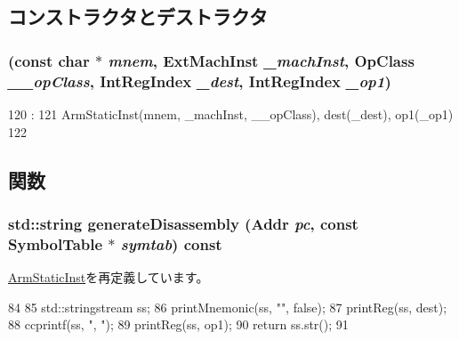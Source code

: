 \subsection{コンストラクタとデストラクタ}
\hypertarget{classArmISA_1_1DataX1RegOp_a32e724330de9abbc94cd6f191b2a7cdb}{
\subsubsection[{DataX1RegOp}]{ (const char $\ast$ {\em mnem}, \/  {\bf ExtMachInst} {\em \_\-machInst}, \/  OpClass {\em \_\-\_\-opClass}, \/  {\bf IntRegIndex} {\em \_\-dest}, \/  {\bf IntRegIndex} {\em \_\-op1})}}
\label{classArmISA_1_1DataX1RegOp_a32e724330de9abbc94cd6f191b2a7cdb}



\begin{DoxyCode}
120                                                      :
121         ArmStaticInst(mnem, _machInst, __opClass), dest(_dest), op1(_op1)
122     {}

\end{DoxyCode}


\subsection{関数}
\hypertarget{classArmISA_1_1DataX1RegOp_a95d323a22a5f07e14d6b4c9385a91896}{
\subsubsection[{generateDisassembly}]{\setlength{\rightskip}{0pt plus 5cm}std::string generateDisassembly ({\bf Addr} {\em pc}, \/  const SymbolTable $\ast$ {\em symtab}) const}}
\label{classArmISA_1_1DataX1RegOp_a95d323a22a5f07e14d6b4c9385a91896}


\hyperlink{classArmISA_1_1ArmStaticInst_a95d323a22a5f07e14d6b4c9385a91896}{ArmStaticInst}を再定義しています。


\begin{DoxyCode}
84 {
85     std::stringstream ss;
86     printMnemonic(ss, "", false);
87     printReg(ss, dest);
88     ccprintf(ss, ", ");
89     printReg(ss, op1);
90     return ss.str();
91 }
\end{DoxyCode}



